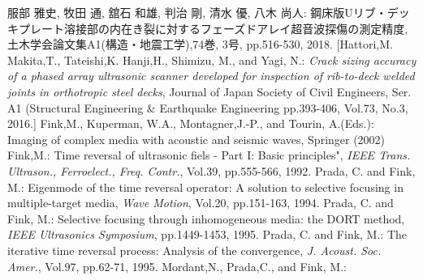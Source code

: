 \documentclass[jscefinal]{jjsce}%
\begin{document}
\begin{thebibliography}{9}
	服部 雅史, 牧田 通, 舘石 和雄, 判治 剛, 清水 優, 八木 尚人:
	鋼床版Uリブ・デッキプレート溶接部の内在き裂に対するフェーズドアレイ超音波探傷の測定精度,
	土木学会論文集A1(構造・地震工学),74巻, 3号, pp.516-530, 2018.
	[Hattori,M. Makita,T., Tateishi,K. Hanji,H., Shimizu, M., and Yagi, N.: 
	\textit{Crack sizing accuracy of a phased array ultrasonic scanner developed for 
	inspection of rib-to-deck welded joints in orthotropic steel decks}, 
	Journal of Japan Society of Civil Engineers, 
	Ser. A1 (Structural Engineering \& Earthquake Engineering 
	pp.393-406, Vol.73, No.3, 2016.]
	Fink,M., Kuperman, W.A.,  Montagner,J.-P., and Tourin, A.(Eds.):
	Imaging of complex media with acoustic and seismic waves, Springer (2002)
	Fink,M.:
	Time reversal of ultrasonic fiels - Part I: Basic principles",
	\textit{IEEE Trans. Ultrason., Ferroelect., Freq. Contr.}, Vol.39, pp.555-566, 1992.
	Prada, C. and Fink, M.: 
	Eigenmode of the time reversal operator: A solution to selective focusing in multiple-target media, 
	\textit{ Wave Motion}, Vol.20, pp.151-163, 1994. 
	Prada, C. and Fink, M.: 
	Selective focusing through inhomogeneous media: the DORT method,
	\textit{ IEEE Ultrasonics Symposium}, pp.1449-1453, 1995. 
	Prada, C. and Fink, M.: 
	The iterative time reversal process: Analysis of the convergence, 
	\textit{J. Acoust. Soc. Amer.}, Vol.97, pp.62-71, 1995.
	Mordant,N., Prada,C., and Fink, M.:

\end{thebibliography}
\end{document}
